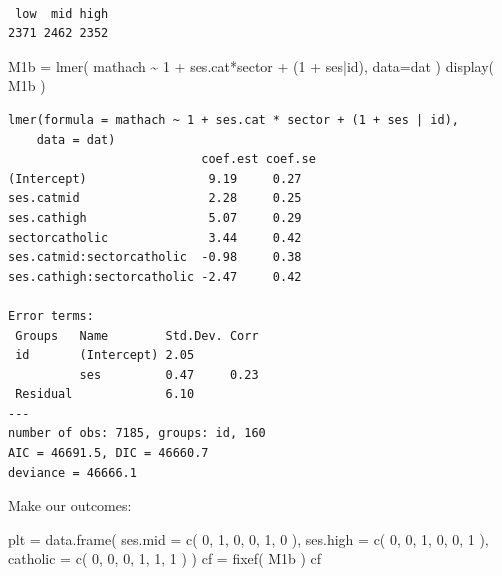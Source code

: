 \documentclass[
  letterpaper,
  DIV=11,
  numbers=noendperiod]{scrreprt}
\newenvironment{Shaded}{}{}
\newcommand{\AttributeTok}[1]{\textcolor[rgb]{0.49,0.56,0.16}{#1}}
\newcommand{\DecValTok}[1]{\textcolor[rgb]{0.25,0.63,0.44}{#1}}
\newcommand{\FunctionTok}[1]{\textcolor[rgb]{0.02,0.16,0.49}{#1}}
\newcommand{\NormalTok}[1]{#1}
\newcommand{\OtherTok}[1]{\textcolor[rgb]{0.00,0.44,0.13}{#1}}
\newcommand{\SpecialCharTok}[1]{\textcolor[rgb]{0.25,0.44,0.63}{#1}}
\begin{document}
\begin{verbatim}

 low  mid high 
2371 2462 2352 
\end{verbatim}

\begin{Shaded}
\begin{Highlighting}[]
\NormalTok{M1b }\OtherTok{=} \FunctionTok{lmer}\NormalTok{( mathach }\SpecialCharTok{\textasciitilde{}} \DecValTok{1} \SpecialCharTok{+}\NormalTok{ ses.cat}\SpecialCharTok{*}\NormalTok{sector }\SpecialCharTok{+}\NormalTok{ (}\DecValTok{1} \SpecialCharTok{+}\NormalTok{ ses}\SpecialCharTok{|}\NormalTok{id), }\AttributeTok{data=}\NormalTok{dat )}
\FunctionTok{display}\NormalTok{( M1b )}
\end{Highlighting}
\end{Shaded}

\begin{verbatim}
lmer(formula = mathach ~ 1 + ses.cat * sector + (1 + ses | id), 
    data = dat)
                           coef.est coef.se
(Intercept)                 9.19     0.27  
ses.catmid                  2.28     0.25  
ses.cathigh                 5.07     0.29  
sectorcatholic              3.44     0.42  
ses.catmid:sectorcatholic  -0.98     0.38  
ses.cathigh:sectorcatholic -2.47     0.42  

Error terms:
 Groups   Name        Std.Dev. Corr 
 id       (Intercept) 2.05          
          ses         0.47     0.23 
 Residual             6.10          
---
number of obs: 7185, groups: id, 160
AIC = 46691.5, DIC = 46660.7
deviance = 46666.1 
\end{verbatim}

Make our outcomes:

\begin{Shaded}
\begin{Highlighting}[]
\NormalTok{plt }\OtherTok{=} \FunctionTok{data.frame}\NormalTok{( }\AttributeTok{ses.mid =} \FunctionTok{c}\NormalTok{( }\DecValTok{0}\NormalTok{, }\DecValTok{1}\NormalTok{, }\DecValTok{0}\NormalTok{, }\DecValTok{0}\NormalTok{, }\DecValTok{1}\NormalTok{, }\DecValTok{0}\NormalTok{ ),}
                  \AttributeTok{ses.high =} \FunctionTok{c}\NormalTok{( }\DecValTok{0}\NormalTok{, }\DecValTok{0}\NormalTok{, }\DecValTok{1}\NormalTok{, }\DecValTok{0}\NormalTok{, }\DecValTok{0}\NormalTok{, }\DecValTok{1}\NormalTok{ ),}
                  \AttributeTok{catholic =} \FunctionTok{c}\NormalTok{( }\DecValTok{0}\NormalTok{, }\DecValTok{0}\NormalTok{, }\DecValTok{0}\NormalTok{, }\DecValTok{1}\NormalTok{, }\DecValTok{1}\NormalTok{, }\DecValTok{1}\NormalTok{ ) )}
\NormalTok{cf }\OtherTok{=} \FunctionTok{fixef}\NormalTok{( M1b )}
\NormalTok{cf}
\end{Highlighting}
\end{Shaded}
\end{document}
